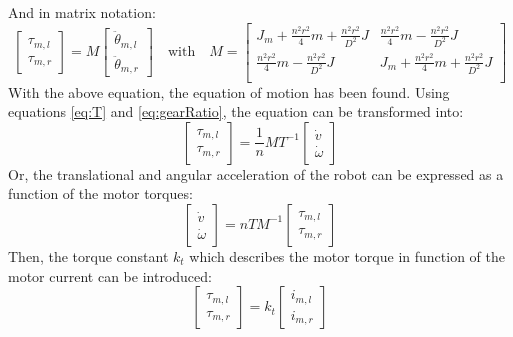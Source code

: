 \documentclass[a4paper, 11pt]{article}
\begin{document}
And in matrix notation:
\begin{equation}
	\begin{bmatrix}
	\tau_{m,l}\\ \tau_{m,r}
	\end{bmatrix}
	= 
	M
	\begin{bmatrix}
	\ddot{\theta}_{m,l}\\ \ddot{\theta}_{m,r}
	\end{bmatrix}
	\quad \textrm{with} \quad 
	M = 
	\begin{bmatrix}
	J_m + \frac{n^2r^2}{4}m + \frac{n^2r^2}{D^2}J & \frac{n^2r^2}{4}m - \frac{n^2r^2}{D^2}J\\[8pt]
	\frac{n^2r^2}{4}m - \frac{n^2r^2}{D^2}J & J_m + \frac{n^2r^2}{4}m + \frac{n^2r^2}{D^2}J\\
	\end{bmatrix}
\end{equation}
With the above equation, the equation of motion has been found. Using equations \eqref{eq:T} and \eqref{eq:gearRatio}, the equation can be transformed into:
\begin{equation}
	\begin{bmatrix}
	\tau_{m,l}\\ \tau_{m,r}
	\end{bmatrix}
	= 
	\frac{1}{n}MT^{-1}
	\begin{bmatrix}
	\dot{v}\\ \dot{\omega}
	\end{bmatrix}
\end{equation}
Or, the translational and angular acceleration of the robot can be expressed as a function of the motor torques:
\begin{equation}
\begin{bmatrix}
\dot{v}\\ \dot{\omega}
\end{bmatrix}
= 
nTM^{-1}
\begin{bmatrix}
\tau_{m,l}\\ \tau_{m,r}
\end{bmatrix}
\end{equation}
Then, the torque constant $k_t$ which describes the motor torque in function of the motor current can be introduced:
\begin{equation}
\begin{bmatrix}
\tau_{m,l} \\ \tau_{m,r}
\end{bmatrix}
= k_t
\begin{bmatrix}
i_{m,l} \\ i_{m,r}
\end{bmatrix}
\label{eq:kt}
\end{equation}
\end{document}
